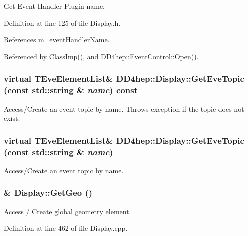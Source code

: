 Get Event Handler Plugin name. 

Definition at line 125 of file Display.h.

References m\_\-eventHandlerName.

Referenced by ClassImp(), and DD4hep::EventControl::Open().\hypertarget{class_d_d4hep_1_1_display_a1900a9f343c5c9625331f36d7ca3d787}{
\subsubsection[{GetEveTopic}]{\setlength{\rightskip}{0pt plus 5cm}virtual {\bf TEveElementList}\& DD4hep::Display::GetEveTopic (const std::string \& {\em name}) const}}
\label{class_d_d4hep_1_1_display_a1900a9f343c5c9625331f36d7ca3d787}


Access/Create an event topic by name. Throws exception if the topic does not exist. \hypertarget{class_d_d4hep_1_1_display_a515cf2ee2cb4e8219a30dc04bc2669b7}{
\subsubsection[{GetEveTopic}]{\setlength{\rightskip}{0pt plus 5cm}virtual {\bf TEveElementList}\& DD4hep::Display::GetEveTopic (const std::string \& {\em name})}}
\label{class_d_d4hep_1_1_display_a515cf2ee2cb4e8219a30dc04bc2669b7}


Access/Create an event topic by name. \hypertarget{class_d_d4hep_1_1_display_a6320adb59a4092821ef4623da5547277}{
\subsubsection[{GetGeo}]{ \& Display::GetGeo ()}}
\label{class_d_d4hep_1_1_display_a6320adb59a4092821ef4623da5547277}


Access / Create global geometry element. 

Definition at line 462 of file Display.cpp.

